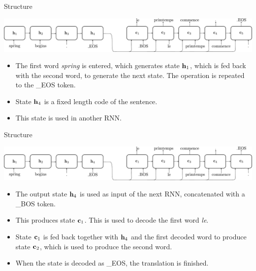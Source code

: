 \documentclass{beamer}
\begin{document}
\begin{frame}{Structure}
\begin{center}
\includegraphics[scale=0.28]{Module 5 (RNN)/pics/sequence_translate_RNN.pdf}
\end{center}
\begin{itemize}
\item The first word \emph{spring} is entered, which generates state ${\bf h}_1$, which is fed back  with the second word, to generate the next state. The operation is repeated to the \_EOS token. 
\item State ${\bf h}_4$ is a fixed length code of the sentence. 
\item This state is used in another RNN. 
\end{itemize}
\end{frame}


\begin{frame}{Structure}
\begin{center}
\includegraphics[scale=0.28]{Module 5 (RNN)/pics/sequence_translate_RNN.pdf}
\end{center}

\begin{itemize}
\item The output state ${\bf h}_4$ is used as input of the next RNN, concatenated with a \_BOS token. 
\item This produces state ${\bf c}_1$. This is used to decode the first word \emph{le}.
\item State ${\bf c}_1$ is fed back together with ${\bf h}_4$ and the first decoded word to produce state ${\bf c}_2$, which is used to produce the second word. 
\item When the state is decoded as \_EOS, the translation is finished. 
\end{itemize}
\end{frame}
\end{document}
